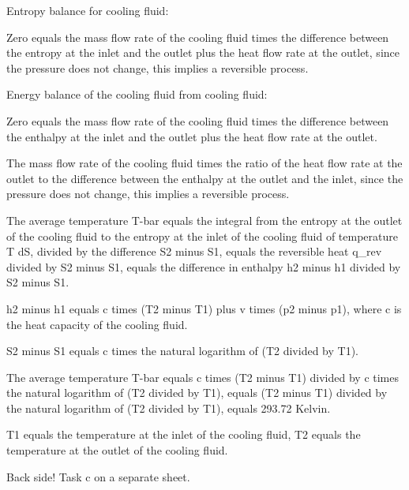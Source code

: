 Entropy balance for cooling fluid:

Zero equals the mass flow rate of the cooling fluid times the difference between the entropy at the inlet and the outlet plus the heat flow rate at the outlet, since the pressure does not change, this implies a reversible process.

Energy balance of the cooling fluid from cooling fluid:

Zero equals the mass flow rate of the cooling fluid times the difference between the enthalpy at the inlet and the outlet plus the heat flow rate at the outlet.

The mass flow rate of the cooling fluid times the ratio of the heat flow rate at the outlet to the difference between the enthalpy at the outlet and the inlet, since the pressure does not change, this implies a reversible process.

The average temperature T-bar equals the integral from the entropy at the outlet of the cooling fluid to the entropy at the inlet of the cooling fluid of temperature T dS, divided by the difference S2 minus S1, equals the reversible heat q_rev divided by S2 minus S1, equals the difference in enthalpy h2 minus h1 divided by S2 minus S1.

h2 minus h1 equals c times (T2 minus T1) plus v times (p2 minus p1), where c is the heat capacity of the cooling fluid.

S2 minus S1 equals c times the natural logarithm of (T2 divided by T1).

The average temperature T-bar equals c times (T2 minus T1) divided by c times the natural logarithm of (T2 divided by T1), equals (T2 minus T1) divided by the natural logarithm of (T2 divided by T1), equals 293.72 Kelvin.

T1 equals the temperature at the inlet of the cooling fluid, T2 equals the temperature at the outlet of the cooling fluid.

Back side! Task c on a separate sheet.